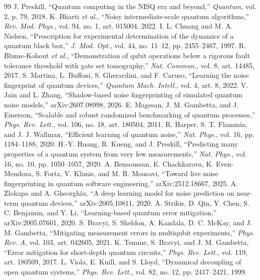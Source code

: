 \documentclass[conference]{IEEEtran}
\begin{document}
\begin{thebibliography}{99}
 J. Preskill, ``Quantum computing in the NISQ era and beyond,'' \emph{Quantum}, vol. 2, p. 79, 2018.
 K. Bharti \emph{et al.}, ``Noisy intermediate-scale quantum algorithms,'' \emph{Rev. Mod. Phys.}, vol. 94, no. 1, art. 015004, 2022.
 I. L. Chuang and M. A. Nielsen, ``Prescription for experimental determination of the dynamics of a quantum black box,'' \emph{J. Mod. Opt.}, vol. 44, no. 11--12, pp. 2455--2467, 1997.
 R. Blume-Kohout \emph{et al.}, ``Demonstration of qubit operations below a rigorous fault tolerance threshold with gate set tomography,'' \emph{Nat. Commun.}, vol. 8, art. 14485, 2017.
 S. Martina, L. Buffoni, S. Gherardini, and F. Caruso, ``Learning the noise fingerprint of quantum devices,'' \emph{Quantum Mach. Intell.}, vol. 4, art. 8, 2022.
 V. Jain and L. Zhang, ``Shadow-based noise fingerprinting of simulated quantum noise models,'' arXiv:2607.08998, 2026.
 E. Magesan, J. M. Gambetta, and J. Emerson, ``Scalable and robust randomized benchmarking of quantum processes,'' \emph{Phys. Rev. Lett.}, vol. 106, no. 18, art. 180504, 2011.
 R. Harper, S. T. Flammia, and J. J. Wallman, ``Efficient learning of quantum noise,'' \emph{Nat. Phys.}, vol. 16, pp. 1184--1188, 2020.
 H.-Y. Huang, R. Kueng, and J. Preskill, ``Predicting many properties of a quantum system from very few measurements,'' \emph{Nat. Phys.}, vol. 16, no. 10, pp. 1050--1057, 2020.
 A. Bensoussan, E. Chachkarova, K. Even-Mendoza, S. Fortz, V. Klimis, and M. R. Mousavi, ``Toward live noise fingerprinting in quantum software engineering,'' arXiv:2512.18667, 2025.
 A. Zlokapa and A. Gheorghiu, ``A deep learning model for noise prediction on near-term quantum devices,'' arXiv:2005.10811, 2020.
 A. Strikis, D. Qin, Y. Chen, S. C. Benjamin, and Y. Li, ``Learning-based quantum error mitigation,'' arXiv:2005.07601, 2020.
 S. Bravyi, S. Sheldon, A. Kandala, D. C. McKay, and J. M. Gambetta, ``Mitigating measurement errors in multiqubit experiments,'' \emph{Phys. Rev. A}, vol. 103, art. 042605, 2021.
 K. Temme, S. Bravyi, and J. M. Gambetta, ``Error mitigation for short-depth quantum circuits,'' \emph{Phys. Rev. Lett.}, vol. 119, art. 180509, 2017.
 L. Viola, E. Knill, and S. Lloyd, ``Dynamical decoupling of open quantum systems,'' \emph{Phys. Rev. Lett.}, vol. 82, no. 12, pp. 2417--2421, 1999.

\end{thebibliography}
\end{document}
